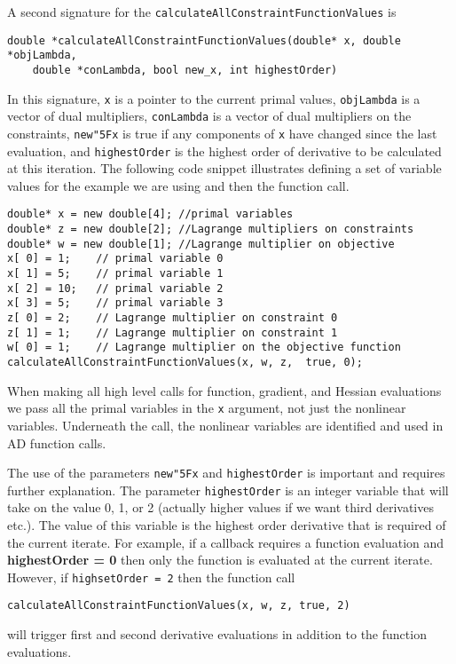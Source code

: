 \documentclass[11pt]{article}
\renewcommand{\_}{{\char"5F}}
\renewcommand{\{}{{\char"7B}}
\renewcommand{\}}{{\char"7D}}
\renewcommand{\^}{{\char"0D}}
\renewcommand{\'}{{\char"0D}}
\begin{document}
A second signature for the {\tt calculateAllConstraintFunctionValues} is
\begin{verbatim}
double *calculateAllConstraintFunctionValues(double* x, double *objLambda,
    double *conLambda, bool new_x, int highestOrder)
\end{verbatim}
In this  signature, {\tt x} is a pointer to the current primal values, {\tt objLambda} is a vector of dual multipliers, {\tt conLambda} is a vector of dual multipliers on the constraints,  {\tt new\_x} is true if any components of {\tt x} have changed since the last evaluation, and {\tt highestOrder} is the highest order of derivative to be calculated at this iteration. The following code snippet illustrates defining a set of variable values for the example we are using and then the function call.
\begin{verbatim}
double* x = new double[4]; //primal variables
double* z = new double[2]; //Lagrange multipliers on constraints
double* w = new double[1]; //Lagrange multiplier on objective
x[ 0] = 1;    // primal variable 0
x[ 1] = 5;    // primal variable 1
x[ 2] = 10;   // primal variable 2
x[ 3] = 5;    // primal variable 3
z[ 0] = 2;    // Lagrange multiplier on constraint 0
z[ 1] = 1;    // Lagrange multiplier on constraint 1
w[ 0] = 1;    // Lagrange multiplier on the objective function
calculateAllConstraintFunctionValues(x, w, z,  true, 0);
\end{verbatim}
When making all high level calls for function, gradient, and Hessian evaluations we pass all the primal variables in the {\tt x} argument, not just the nonlinear variables. Underneath the call, the nonlinear variables are identified and used in AD function calls.

The use of the parameters  {\tt new\_x} and {\tt highestOrder}  is important and requires further explanation.    The parameter  {\tt highestOrder}  is an integer variable that will take on the value 0, 1, or 2 (actually higher values if we want third derivatives etc.).  The value of this variable is the highest order derivative that is required of the current iterate. For example, if  a callback requires a function evaluation and {\bf highestOrder = 0} then only the function is evaluated at the current iterate.  However,  if {\tt highsetOrder = 2} then the function call
\begin{verbatim}
calculateAllConstraintFunctionValues(x, w, z, true, 2)
\end{verbatim}
will trigger  first and second derivative evaluations in addition to the function evaluations.
\end{document}
